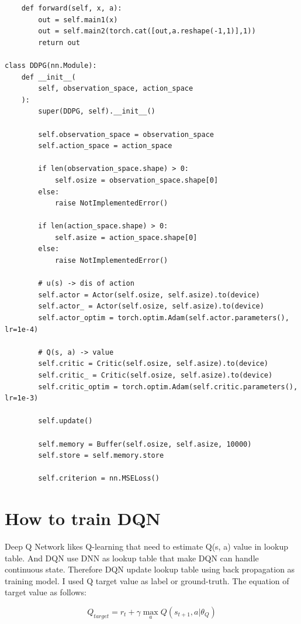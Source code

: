 \documentclass[12pt]{article}
\begin{document}
\begin{verbatim}
    def forward(self, x, a):
        out = self.main1(x)
        out = self.main2(torch.cat([out,a.reshape(-1,1)],1))
        return out

class DDPG(nn.Module):
    def __init__(
        self, observation_space, action_space
    ):
        super(DDPG, self).__init__()
    
        self.observation_space = observation_space
        self.action_space = action_space
    
        if len(observation_space.shape) > 0:
            self.osize = observation_space.shape[0]
        else:
            raise NotImplementedError()
            
        if len(action_space.shape) > 0:
            self.asize = action_space.shape[0]
        else:
            raise NotImplementedError()
        
        # u(s) -> dis of action
        self.actor = Actor(self.osize, self.asize).to(device)
        self.actor_ = Actor(self.osize, self.asize).to(device)
        self.actor_optim = torch.optim.Adam(self.actor.parameters(), lr=1e-4)
    
        # Q(s, a) -> value
        self.critic = Critic(self.osize, self.asize).to(device)
        self.critic_ = Critic(self.osize, self.asize).to(device)
        self.critic_optim = torch.optim.Adam(self.critic.parameters(), lr=1e-3)
    
        self.update()
        
        self.memory = Buffer(self.osize, self.asize, 10000)
        self.store = self.memory.store
        
        self.criterion = nn.MSELoss()
\end{verbatim}

\section{How to train DQN}

Deep Q Network likes Q-learning that need to estimate Q(s, a) value in lookup table. And DQN use DNN as lookup table that make DQN can handle continuous state. Therefore DQN update lookup table using back propagation as training model. I used Q target value as label or ground-truth. The equation of target value as follows:

\begin{equation}
   Q_{target} =  r_t + \gamma \max_a Q(s_{t+1}, a | \theta_Q )
\end{equation}
\end{document}
